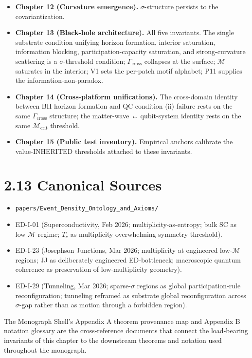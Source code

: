 \documentclass[11pt]{book}
\begin{document}
\begin{itemize}
\item \textbf{Chapter 12 (Curvature emergence).} $\sigma$-structure persists to the covariantization.
\item \textbf{Chapter 13 (Black-hole architecture).} All five invariants. The single substrate condition unifying horizon formation, interior saturation, information blocking, participation-capacity saturation, and strong-curvature scattering is a $\sigma$-threshold condition; $\Gamma_\mathrm{cross}$ collapses at the surface; $\mathcal{M}$ saturates in the interior; V1 sets the per-patch motif alphabet; P11 supplies the information-non-paradox.
\item \textbf{Chapter 14 (Cross-platform unifications).} The cross-domain identity between BH horizon formation and QC condition (ii) failure rests on the same $\Gamma_\mathrm{cross}$ structure; the matter-wave ↔ qubit-system identity rests on the same $\mathcal{M}_\mathrm{crit}$ threshold.
\item \textbf{Chapter 15 (Public test inventory).} Empirical anchors calibrate the value-INHERITED thresholds attached to these invariants.
\end{itemize}

\section{2.13 Canonical Sources}

\begin{itemize}
\item \texttt{papers/Event\_Density\_Ontology\_and\_Axioms/}
\item ED-I-01 (Superconductivity, Feb 2026; multiplicity-as-entropy; bulk SC as low-$\mathcal{M}$ regime; $T_c$ as multiplicity-overwhelming-symmetry threshold).
\item ED-I-23 (Josephson Junctions, Mar 2026; multiplicity at engineered low-$\mathcal{M}$ regions; JJ as deliberately engineered ED-bottleneck; macroscopic quantum coherence as preservation of low-multiplicity geometry).
\item ED-I-29 (Tunneling, Mar 2026; sparse-$\sigma$ regions as global participation-rule reconfiguration; tunneling reframed as substrate global reconfiguration across $\sigma$-gap rather than as motion through a forbidden region).
\end{itemize}

The Monograph Shell's Appendix A theorem provenance map and Appendix B notation glossary are the cross-reference documents that connect the load-bearing invariants of this chapter to the downstream theorems and notation used throughout the monograph.
\end{document}
